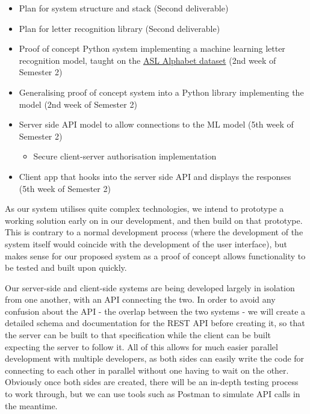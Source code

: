 \documentclass[10pt]{article}
\begin{document}
\begin{itemize}
  \item Plan for system structure and stack (Second deliverable)
  \item Plan for letter recognition library (Second deliverable)
  \item Proof of concept Python system implementing a machine learning letter recognition model, 
    taught on the \href{https://www.kaggle.com/grassknoted/asl-alphabet}{ASL Alphabet dataset}  
    (2nd week of Semester 2)
  \item Generalising proof of concept system into a Python library implementing the model (2nd week 
    of Semester 2)
  \item Server side API model to allow connections to the ML model (5th week of Semester 2)
  \begin{itemize}
    \item Secure client-server authorisation implementation
  \end{itemize}
  \item Client app that hooks into the server side API and displays the responses (5th week of 
    Semester 2)

\end{itemize}

As our system utilises quite complex technologies, we intend to prototype a working solution early 
on in our development, and then build on that prototype. This is contrary to a normal development 
process (where the development of the system itself would coincide with the development of the user 
interface), but makes sense for our proposed system as a proof of concept allows functionality to be 
tested and built upon quickly. 

Our server-side and client-side systems are being developed largely in isolation from one another, 
with an API connecting the two. In order to avoid any confusion about the API - the overlap between 
the two systems -  we will create a detailed schema and documentation for the REST API before 
creating it, so that the server can be built to that specification while the client can be built 
expecting the server to follow it. All of this allows for much easier parallel development with 
multiple developers, as both sides can easily write the code for connecting to each other in 
parallel without one having to wait on the other. Obviously once both sides are created, there will 
be an in-depth testing process to work through, but we can use tools such as Postman to simulate API 
calls in the meantime. 
\end{document}
